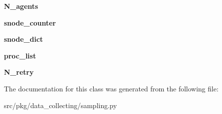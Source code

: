 \begin{DoxyCompactItemize}
{\bfseries N\+\_\+agents}
\item 
\mbox{\label{classrnb-planning_1_1src_1_1pkg_1_1data__collecting_1_1sampling_1_1_data_collector_abb470ba252c3c693fa41ad99ea4434f8}} 
{\bfseries snode\+\_\+counter}
\item 
\mbox{\label{classrnb-planning_1_1src_1_1pkg_1_1data__collecting_1_1sampling_1_1_data_collector_a9c3b6c3e25e8ef417b37a6e0a091ec6b}} 
{\bfseries snode\+\_\+dict}
\item 
\mbox{\label{classrnb-planning_1_1src_1_1pkg_1_1data__collecting_1_1sampling_1_1_data_collector_aa404a6bc545ed063b34d50cc7b8aa1e2}} 
{\bfseries proc\+\_\+list}
\item 
\mbox{\label{classrnb-planning_1_1src_1_1pkg_1_1data__collecting_1_1sampling_1_1_data_collector_ab7e0f44d1133812b5a4f39a66a70890f}} 
{\bfseries N\+\_\+retry}
\end{DoxyCompactItemize}


The documentation for this class was generated from the following file\+:\begin{DoxyCompactItemize}
\item 
src/pkg/data\+\_\+collecting/sampling.\+py\end{DoxyCompactItemize}
